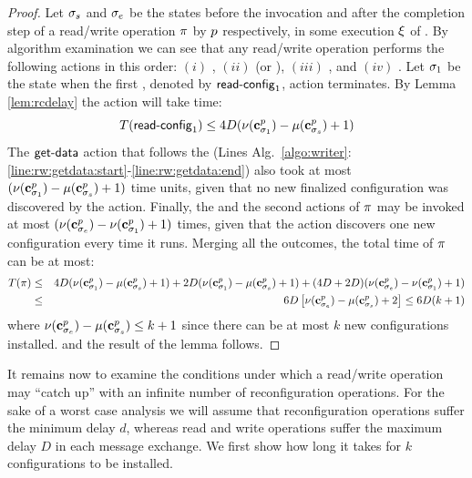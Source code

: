 \begin{proof}
	Let $\sigma_s$ and $\sigma_e$ be the states before the invocation 
	and after the completion step of a read/write operation $\pi$ by $p$ respectively,
	in some execution $\EX$ of \ares. 
	By algorithm examination we can 
	see that any read/write operation performs the following actions in this order:
	$(i)$  , $(ii)$  (or ), $(iii)$ ,
	and $(iv)$ . Let $\sigma_1$ be the state when the first , denoted by $\act{read-config}_1$, 
	action terminates. By Lemma \ref{lem:rcdelay} the action will take time:
	\[
		\opdelay{\act{read-config}_1} \leq 4\lgdelay(\nu(\cvec{\pr}{\state_1})-\mu(\cvec{\pr}{\state_s})+1)
	\]
	The $\act{get-data}$ action that follows the  (Lines Alg.~\ref{algo:writer}:\ref{line:rw:getdata:start}-\ref{line:rw:getdata:end}) also took at most $(\nu(\mathbf{c}^{p}_{\sigma_1})-\mu(\mathbf{c}^{p}_{\sigma_s})+1)$ time units,
	given that no new finalized configuration was discovered by the  action. 
	Finally, the   and the second  actions of $\pi$ may be invoked at most
	$(\nu(\mathbf{c}^{p}_{\sigma_e})-\nu(\mathbf{c}^{p}_{\sigma_1})+1)$ times, given that the  action discovers 
	one new configuration every time it runs. Merging all the outcomes, the total time of $\pi$ can be at most:
	\begin{eqnarray*}
	T(\pi) & \leq & 4D(\nu(\mathbf{c}^{p}_{\sigma_1})-\mu(\mathbf{c}^{p}_{\sigma_s})+1) + 2D(\nu(\mathbf{c}^{p}_{\sigma_1})-\mu(\mathbf{c}^{p}_{\sigma_s})+1) + (4D+2D)(\nu(\mathbf{c}^{p}_{\sigma_e})-\nu(\mathbf{c}^{p}_{\sigma_1})+1) \\
	 & \leq & 6D\left[\nu(\mathbf{c}^{p}_{\sigma_e}) - \mu(\mathbf{c}^{p}_{\sigma_s})+2\right] \leq 6D(k+1)
	\end{eqnarray*}
where  $\nu(\mathbf{c}^{p}_{\sigma_e}) - \mu(\mathbf{c}^{p}_{\sigma_s})\leq k + 1$ since there can be at most $k$ new configurations installed. and the result of the lemma follows.
\end{proof}

It remains now to examine the conditions under which a read/write operation may “catch up” with an infinite number of reconfiguration operations.
For the sake of a worst case analysis we will assume that reconfiguration operations suffer 
the minimum delay $d$, whereas read and write operations suffer the maximum
delay $D$ in each message exchange. 
We first show how long it takes for $k$ configurations to be installed.

